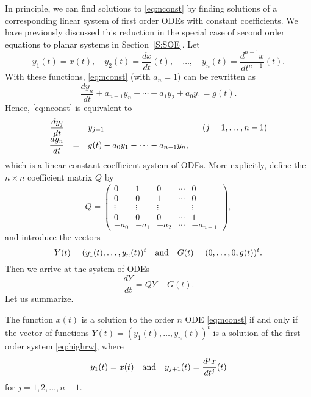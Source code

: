 \documentclass{ximera}
\begin{document}
In principle, we can find solutions to \eqref{eq:nconst} by finding 
solutions of a corresponding 
linear system of first order 
ODEs with 
constant coefficients.  We have previously discussed this reduction in
the special case of second order equations to planar systems in 
Section~\ref{S:SOE}.  Let
\begin{equation}   \label{eq:trick}
y_1(t)=x(t),\quad y_2(t)=\frac{dx}{dt}(t),\quad
\ldots, \quad  y_n(t)=\frac{d^{n-1}x}{dt^{n-1}}(t).
\end{equation}
With these functions, \eqref{eq:nconst} (with $a_n=1$) can be rewritten as
\[
\frac{dy_n}{dt} + a_{n-1} y_n + \cdots + a_1 y_2 + a_0 y_1 = g(t).
\]
Hence, \eqref{eq:nconst} is equivalent to
\arraystart
\[
\begin{array}{rcl}
\displaystyle \frac{dy_j}{dt}&=&y_{j+1} \hspace{1.6in} (j=1,\ldots,n-1)\\
\displaystyle \frac{dy_n}{dt}&=& g(t) - a_0y_1 - \cdots - a_{n-1} y_n,
\end{array}
\]
\arrayfinish
which is a linear constant coefficient system of ODEs.  More explicitly,
define the $n\times n$ coefficient matrix $Q$ by 
\begin{equation}   \label{eq:coefma}
Q = \left(\begin{array}{ccccc}
0 & 1 & 0 & \cdots & 0\\
0 & 0 & 1 & \cdots & 0\\
\vdots & \vdots & \vdots & & \vdots\\
0 & 0 & 0 & \cdots & 1\\
-a_0 & -a_1 &  -a_2 & \cdots & -a_{n-1}
\end{array}\right),
\end{equation}
and introduce the vectors 
\[
Y(t) = (y_1(t),\ldots,y_n(t))^t  \quad\mbox{and}\quad
G(t) = (0,\ldots,0,g(t))^t.  
\]
Then we arrive at the system of ODEs
\begin{equation}  \label{eq:highrw}
\frac{dY}{dt} = QY+G(t).
\end{equation}
Let us summarize.
\begin{proposition}   \label{prop:ho1}
The function $x(t)$ is a solution to the order $n$ ODE \eqref{eq:nconst}  
if and only if the vector of functions $Y(t)=(y_1(t),\ldots,y_n(t))^t$ is 
a solution of the first order system \eqref{eq:highrw}, where 
\[
y_1(t) = x(t) \quad\mbox{and}\quad y_{j+1}(t)=\displaystyle \frac{d^jx}{dt^j}(t) 
\]
for $j=1,2,\ldots,n-1$.
\end{proposition}
\end{document}
